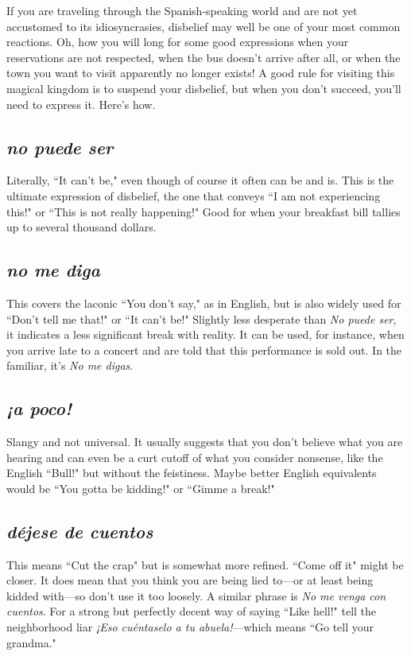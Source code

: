 If you are traveling through the Spanish-speaking world and
are not yet accustomed to its idiosyncrasies, disbelief may well be one
of your most common reactions. Oh, how you will long for some good
expressions when your reservations are not respected, when the bus
doesn't arrive after all, or when the town you want to visit apparently
no longer exists! A good rule for visiting this magical kingdom is to
suspend your disbelief, but when you don't succeed, you'll need to express it. Here's how.

\subsection{\emph{no puede ser}}

Literally, ``It can't be," even though of course it often can be
and is. This is the ultimate expression of disbelief, the one that conveys ``I am not experiencing this!" or ``This is not really happening!"
Good for when your breakfast bill tallies up to several thousand
dollars.

\subsection{\emph{no me diga}}

This covers the laconic ``You don't say," as in English, but is
also widely used for ``Don't tell me that!" or ``It can't be!" Slightly less
desperate than \emph{No puede ser}, it indicates a less significant break with
reality. It can be used, for instance, when you arrive late to a concert
and are told that this performance is sold out. In the familiar, it's \emph{No me digas}.

\subsection{\emph{¡a poco!}}

Slangy and not universal. It usually suggests that you don't believe what you are hearing and can even be a curt cutoff of what you
consider nonsense, like the English ``Bull!" but without the feistiness.
Maybe better English equivalents would be ``You gotta be kidding!" or
``Gimme a break!"

\subsection{\emph{déjese de cuentos}}

This means ``Cut the crap" but is somewhat more refined.
``Come off it" might be closer. It does mean that you think you are
being lied to---or at least being kidded with---so don't use it too loosely.
A similar phrase is \emph{No me venga con cuentos}. For a strong but
perfectly decent way of saying ``Like hell!" tell the neighborhood liar \emph{¡Eso
cuéntaselo a tu abuela!}---which means ``Go tell your grandma."

